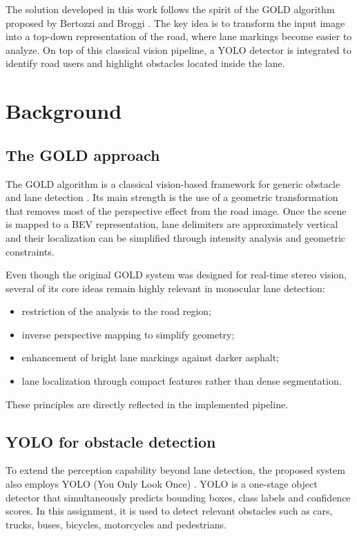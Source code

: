 \documentclass[conference]{IEEEtran}
\begin{document}
The solution developed in this work follows the spirit of the GOLD algorithm proposed by Bertozzi and Broggi \cite{gold_paper}. The key idea is to transform the input image into a top-down representation of the road, where lane markings become easier to analyze. On top of this classical vision pipeline, a YOLO detector is integrated to identify road users and highlight obstacles located inside the lane.

\section{Background}
\subsection{The GOLD approach}
The GOLD algorithm is a classical vision-based framework for generic obstacle and lane detection \cite{gold_paper}. Its main strength is the use of a geometric transformation that removes most of the perspective effect from the road image. Once the scene is mapped to a BEV representation, lane delimiters are approximately vertical and their localization can be simplified through intensity analysis and geometric constraints.

Even though the original GOLD system was designed for real-time stereo vision, several of its core ideas remain highly relevant in monocular lane detection:
\begin{itemize}
    \item restriction of the analysis to the road region;
    \item inverse perspective mapping to simplify geometry;
    \item enhancement of bright lane markings against darker asphalt;
    \item lane localization through compact features rather than dense segmentation.
\end{itemize}

These principles are directly reflected in the implemented pipeline.

\subsection{YOLO for obstacle detection}
To extend the perception capability beyond lane detection, the proposed system also employs YOLO (You Only Look Once) \cite{yolo}. YOLO is a one-stage object detector that simultaneously predicts bounding boxes, class labels and confidence scores. In this assignment, it is used to detect relevant obstacles such as cars, trucks, buses, bicycles, motorcycles and pedestrians.
\end{document}
